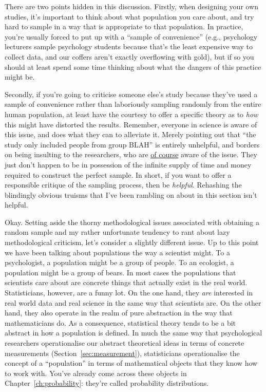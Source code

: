 There are two points hidden in this discussion. Firstly, when designing your own studies, it's important to think about what population you care about, and try hard to sample in a way that is appropriate to that population. In practice, you're usually forced to put up with a ``sample of convenience'' (e.g., psychology lecturers sample psychology students because that's the least expensive way to collect data, and our coffers aren't exactly overflowing with gold), but if so you should at least spend some time thinking about what the dangers of this practice might be.

Secondly, if you're going to criticise someone else's study because they've used a sample of convenience rather than laboriously sampling randomly from the entire human population, at least have the courtesy to offer a specific theory as to {\it how} this might have distorted the results. Remember, everyone in science is aware of this issue, and does what they can to alleviate it. Merely pointing out that ``the study only included people from group BLAH'' is entirely unhelpful, and borders on being insulting to the researchers, who are \underline{of course} aware of the issue. They just don't happen to be in possession of the infinite supply of time and money required to construct the perfect sample. In short, if you want to offer a responsible critique of the sampling process, then be {\it helpful}. Rehashing the blindingly obvious truisms that I've been rambling on about in this section isn't helpful.


Okay. Setting aside the thorny methodological issues associated with obtaining a random sample and my rather unfortunate tendency to rant about lazy methodological criticism, let's consider a slightly different issue. Up to this point we have been talking about populations the way a scientist might. To a psychologist, a population might be a group of people. To an ecologist, a population might be a group of bears. In most cases the populations that scientists care about are concrete things that actually exist in the real world. Statisticians, however, are a funny lot. On the one hand, they {\it are} interested in real world data and real science in the same way that scientists are. On the other hand, they also operate in the realm of pure abstraction in the way that mathematicians do. As a consequence, statistical theory tends to be a bit abstract in how a population is defined. In much the same way that psychological researchers operationalise our abstract theoretical ideas in terms of concrete measurements (Section~\ref{sec:measurement}), statisticians operationalise the concept of a ``population'' in terms of mathematical objects that they know how to work with. You've already come across these objects in Chapter~\ref{ch:probability}: they're called probability distributions.

